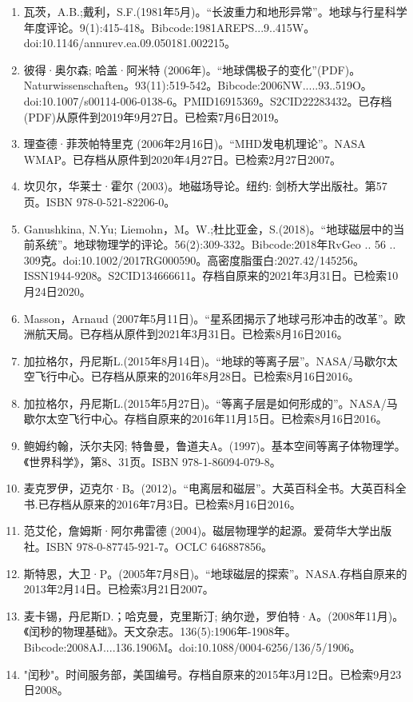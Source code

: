 \begin{enumerate}
\item 瓦茨，A.B.;戴利，S.F.(1981年5月)。“长波重力和地形异常”。地球与行星科学年度评论。9(1):415-418。Bibcode:1981AREPS...9..415W。doi:10.1146/annurev.ea.09.050181.002215。
\item 彼得·奥尔森; 哈盖·阿米特 (2006年)。“地球偶极子的变化”(PDF)。Naturwissenschaften。93(11):519-542。Bibcode:2006NW.....93..519O。doi:10.1007/s00114-006-0138-6。PMID16915369。S2CID22283432。已存档(PDF)从原件到2019年9月27日。已检索7月6日2019。   
\item 理查德·菲茨帕特里克 (2006年2月16日)。“MHD发电机理论”。NASA WMAP。已存档从原件到2020年4月27日。已检索2月27日2007。
\item 坎贝尔，华莱士·霍尔 (2003)。地磁场导论。纽约: 剑桥大学出版社。第57页。ISBN 978-0-521-82206-0。
\item Ganushkina, N.Yu; Liemohn，M。W.;杜比亚金，S.(2018)。“地球磁层中的当前系统”。地球物理学的评论。56(2):309-332。Bibcode:2018年RvGeo .. 56 .. 309克。doi:10.1002/2017RG000590。高密度脂蛋白:2027.42/145256。ISSN1944-9208。S2CID134666611。存档自原来的2021年3月31日。已检索10月24日2020。  
\item Masson，Arnaud (2007年5月11日)。“星系团揭示了地球弓形冲击的改革”。欧洲航天局。已存档从原件到2021年3月31日。已检索8月16日2016。
\item 加拉格尔，丹尼斯L.(2015年8月14日)。“地球的等离子层”。NASA/马歇尔太空飞行中心。已存档从原来的2016年8月28日。已检索8月16日2016。
\item 加拉格尔，丹尼斯L.(2015年5月27日)。“等离子层是如何形成的”。NASA/马歇尔太空飞行中心。存档自原来的2016年11月15日。已检索8月16日2016。
\item 鲍姆约翰，沃尔夫冈; 特鲁曼，鲁道夫A。(1997)。基本空间等离子体物理学。《世界科学》，第8、31页。ISBN 978-1-86094-079-8。
\item 麦克罗伊，迈克尔·B。(2012)。“电离层和磁层”。大英百科全书。大英百科全书.已存档从原来的2016年7月3日。已检索8月16日2016。
\item 范艾伦，詹姆斯·阿尔弗雷德 (2004)。磁层物理学的起源。爱荷华大学出版社。ISBN 978-0-87745-921-7。OCLC 646887856。
\item 斯特恩，大卫·P。(2005年7月8日)。“地球磁层的探索”。NASA.存档自原来的2013年2月14日。已检索3月21日2007。
\item 麦卡锡，丹尼斯D.；哈克曼，克里斯汀; 纳尔逊，罗伯特·A。(2008年11月)。《闰秒的物理基础》。天文杂志。136(5):1906年-1908年。Bibcode:2008AJ....136.1906M。doi:10.1088/0004-6256/136/5/1906。
\item "闰秒"。时间服务部，美国编号。存档自原来的2015年3月12日。已检索9月23日2008。

\end{enumerate}
